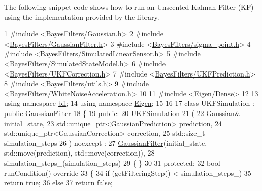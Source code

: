 The following snippet code shows how to run an Unscented Kalman Filter (KF) using the implementation provided by the library.~\newline



\begin{DoxyCodeInclude}
1 \textcolor{preprocessor}{#include <\mbox{\hyperlink{Gaussian_8h}{BayesFilters/Gaussian.h}}>}
2 \textcolor{preprocessor}{#include <\mbox{\hyperlink{GaussianFilter_8h}{BayesFilters/GaussianFilter.h}}>}
3 \textcolor{preprocessor}{#include <\mbox{\hyperlink{sigma__point_8h}{BayesFilters/sigma\_point.h}}>}
4 \textcolor{preprocessor}{#include <\mbox{\hyperlink{SimulatedLinearSensor_8h}{BayesFilters/SimulatedLinearSensor.h}}>}
5 \textcolor{preprocessor}{#include <\mbox{\hyperlink{SimulatedStateModel_8h}{BayesFilters/SimulatedStateModel.h}}>}
6 \textcolor{preprocessor}{#include <\mbox{\hyperlink{UKFCorrection_8h}{BayesFilters/UKFCorrection.h}}>}
7 \textcolor{preprocessor}{#include <\mbox{\hyperlink{UKFPrediction_8h}{BayesFilters/UKFPrediction.h}}>}
8 \textcolor{preprocessor}{#include <\mbox{\hyperlink{utils_8h}{BayesFilters/utils.h}}>}
9 \textcolor{preprocessor}{#include <\mbox{\hyperlink{WhiteNoiseAcceleration_8h}{BayesFilters/WhiteNoiseAcceleration.h}}>}
10 
11 \textcolor{preprocessor}{#include <Eigen/Dense>}
12 
13 \textcolor{keyword}{using namespace }\mbox{\hyperlink{namespacebfl}{bfl}};
14 \textcolor{keyword}{using namespace }\mbox{\hyperlink{namespaceEigen}{Eigen}};
15 
16 
17 \textcolor{keyword}{class }UKFSimulation : \textcolor{keyword}{public} \mbox{\hyperlink{classbfl_1_1GaussianFilter}{GaussianFilter}}
18 \{
19 \textcolor{keyword}{public}:
20     UKFSimulation
21     (
22         \mbox{\hyperlink{classbfl_1_1Gaussian}{Gaussian}}& initial\_state,
23         std::unique\_ptr<GaussianPrediction> prediction,
24         std::unique\_ptr<GaussianCorrection> correction,
25         std::size\_t simulation\_steps
26     ) noexcept :
27         \mbox{\hyperlink{classbfl_1_1GaussianFilter}{GaussianFilter}}(initial\_state, std::move(prediction), std::move(correction)),
28         simulation\_steps\_(simulation\_steps)
29     \{ \}
30 
31 \textcolor{keyword}{protected}:
32     \textcolor{keywordtype}{bool} runCondition()\textcolor{keyword}{ override}
33 \textcolor{keyword}{    }\{
34         \textcolor{keywordflow}{if} (getFilteringStep() < simulation\_steps\_)
35             \textcolor{keywordflow}{return} \textcolor{keyword}{true};
36         \textcolor{keywordflow}{else}
37             \textcolor{keywordflow}{return} \textcolor{keyword}{false};

\end{DoxyCodeInclude}
